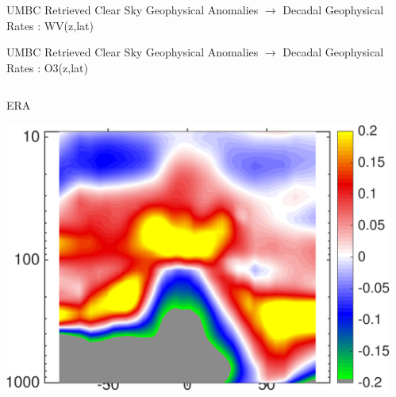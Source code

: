 \documentclass[10pt,t]{beamer}
\begin{document}
\begin{frame}{UMBC Retrieved Clear Sky Geophysical Anomalies $\rightarrow$ Decadal Geophysical Rates : WV(z,lat)}
\end{frame}


\begin{frame}{UMBC Retrieved Clear Sky Geophysical Anomalies $\rightarrow$ Decadal Geophysical Rates : O3(z,lat)}
\vspace{-0.35in}

\begin{columns}
\begin{column}{0.45\columnwidth}
\begin{block}{\footnotesize ERA}
\vspace{-0.1in}
\begin{center}
\includegraphics[width=\linewidth]{Figs/ClearAnom/rawERAo3rates.png}
\end{center}
\end{block}
\end{column}

\begin{column}{0.45\columnwidth}
\end{column}
\end{columns}

\vspace{-0.25in}


\end{frame}
\end{document}
